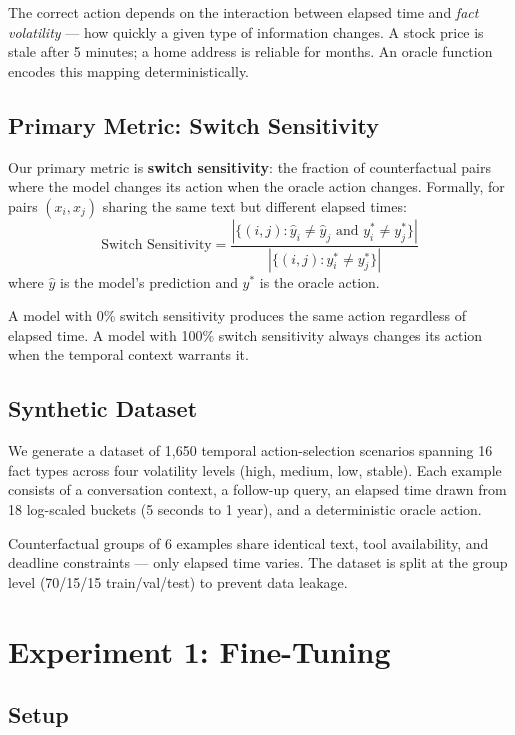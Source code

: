 \documentclass[11pt,a4paper]{article}
\begin{document}
The correct action depends on the interaction between elapsed time and \emph{fact volatility} --- how quickly a given type of information changes.
A stock price is stale after 5 minutes; a home address is reliable for months.
An oracle function encodes this mapping deterministically.

\subsection{Primary Metric: Switch Sensitivity}

Our primary metric is \textbf{switch sensitivity}: the fraction of counterfactual pairs where the model changes its action when the oracle action changes.
Formally, for pairs $(x_i, x_j)$ sharing the same text but different elapsed times:
\[
\text{Switch Sensitivity} = \frac{|\{(i,j) : \hat{y}_i \neq \hat{y}_j \text{ and } y_i^* \neq y_j^*\}|}{|\{(i,j) : y_i^* \neq y_j^*\}|}
\]
where $\hat{y}$ is the model's prediction and $y^*$ is the oracle action.

A model with 0\% switch sensitivity produces the same action regardless of elapsed time.
A model with 100\% switch sensitivity always changes its action when the temporal context warrants it.

\subsection{Synthetic Dataset}

We generate a dataset of 1{,}650 temporal action-selection scenarios spanning 16 fact types across four volatility levels (high, medium, low, stable).
Each example consists of a conversation context, a follow-up query, an elapsed time drawn from 18 log-scaled buckets (5 seconds to 1 year), and a deterministic oracle action.

Counterfactual groups of 6 examples share identical text, tool availability, and deadline constraints --- only elapsed time varies.
The dataset is split at the group level (70/15/15 train/val/test) to prevent data leakage.

\section{Experiment 1: Fine-Tuning}
\label{sec:finetune}

\subsection{Setup}
\end{document}
